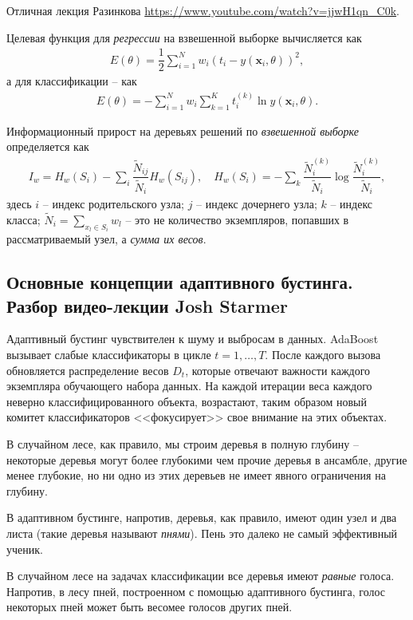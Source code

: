 \documentclass[%
	11pt,
	a4paper,
	utf8,
		]{article}
\begin{document}
Отличная лекция Разинкова \url{https://www.youtube.com/watch?v=jjwH1qn_C0k}.

Целевая функция для \emph{регрессии} на взвешенной выборке вычисляется как
\begin{align*}
	E(\theta) = \dfrac{1}{2} \sum_{i=1}^{N} w_i (t_i - y(\mathbf{x}_i, \theta))^2,
\end{align*}
а для классификации -- как
\begin{align*}
	E(\theta) = - \sum_{i=1}^{N}w_i \sum_{k=1}^{K} t_i^{(k)}\ln {y}(\mathbf{x}_i, \theta).
\end{align*}

Информационный прирост на деревьях решений по \emph{взвешенной выборке} определяется как
\begin{align*}
	I_w = H_w(S_i) - \sum_{i} \dfrac{\tilde{N}_{ij}}{\tilde{N}_i} H_w(S_{ij}), \quad H_w(S_i) = - \sum_k \dfrac{\tilde{N}_i^{(k)}}{\tilde{N}_i} \log \dfrac{\tilde{N}_i^{(k)}}{\tilde{N}_i},
\end{align*}
здесь $ i $ -- индекс родительского узла; $ j $ -- индекс дочернего узла; $ k $ -- индекс класса; $ \tilde{N}_i = \sum\limits_{x_l \in S_i} w_l $ -- это не количество экземпляров, попавших в рассматриваемый узел, а \emph{сумма их весов}.



\subsection{Основные концепции адаптивного бустинга. Разбор видео-лекции Josh Starmer}

Адаптивный бустинг чувствителен к шуму и выбросам в данных. AdaBoost вызывает слабые классификаторы в цикле $ t = 1, \ldots, T $. После каждого вызова обновляется распределение весов $ D_t $, которые отвечают важности каждого экземпляра обучающего набора данных. На каждой итерации веса каждого неверно классифицированного объекта, возрастают, таким образом новый комитет классификаторов <<фокусирует>> свое внимание на этих объектах.

В случайном лесе, как правило, мы строим деревья в полную глубину -- некоторые деревья могут более глубокими чем прочие деревья в ансамбле, другие менее глубокие, но ни одно из этих деревьев не имеет явного ограничения на глубину.

В адаптивном бустинге, напротив, деревья, как правило, имеют один узел и два листа (такие деревья называют \emph{пнями}). Пень это далеко не самый эффективный ученик.

В случайном лесе на задачах классификации все деревья имеют \emph{равные} голоса. Напротив, в лесу пней, построенном с помощью адаптивного бустинга, голос некоторых пней может быть весомее голосов других пней.
\end{document}
